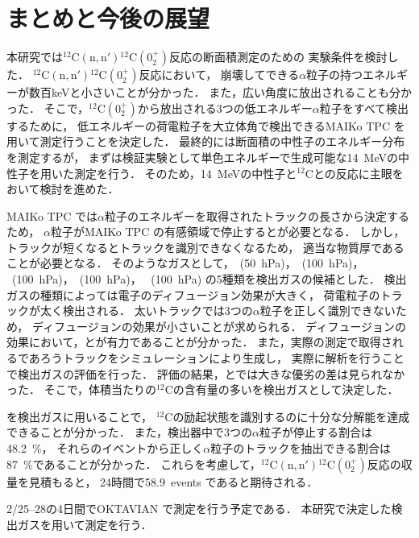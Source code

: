 \documentclass[../master]{subfiles}
\begin{document}
\chapter{まとめと今後の展望}
本研究では${}^{12}\mathrm{C}(\mathrm{n}, \mathrm{n}'){}^{12}\mathrm{C} (0_2^+)$反応の断面積測定のための
実験条件を検討した．
${}^{12}\mathrm{C}(\mathrm{n}, \mathrm{n}'){}^{12}\mathrm{C} (0_2^+)$反応において，
崩壊してできる$\alpha$粒子の持つエネルギーが数百\si{\kilo\electronvolt}と小さいことが分かった．
また，広い角度に放出されることも分かった．
そこで，${}^{12}\mathrm{C} (0_2^+)$から放出される3つの低エネルギー$\alpha$粒子をすべて検出するために，
低エネルギーの荷電粒子を大立体角で検出できるMAIKo TPC を用いて測定行うことを決定した．
最終的には断面積の中性子のエネルギー分布を測定するが，
まずは検証実験として単色エネルギーで生成可能な\SI{14}{\mega\electronvolt}の中性子を用いた測定を行う．
そのため，\SI{14}{\mega\electronvolt}の中性子と${}^{12}\mathrm{C}$との反応に主眼をおいて検討を進めた．

MAIKo TPC では$\alpha$粒子のエネルギーを取得されたトラックの長さから決定するため，
$\alpha$粒子がMAIKo TPC の有感領域で停止するとが必要となる．
しかし，トラックが短くなるとトラックを識別できなくなるため，
適当な物質厚であることが必要となる．
そのようなガスとして，\Methane~(\SI{50}{\hecto\pascal})，\MethaneHydro~(\SI{100}{\hecto\pascal})，
\MethaneHerium~(\SI{100}{\hecto\pascal})，\isoButaneHydro~(\SI{100}{\hecto\pascal})，
\isoButaneHerium~(\SI{100}{\hecto\pascal}) の5種類を検出ガスの候補とした．
検出ガスの種類によっては電子のディフュージョン効果が大きく，
荷電粒子のトラックが太く検出される．
太いトラックでは3つの$\alpha$粒子を正しく識別できないため，
ディフュージョンの効果が小さいことが求められる．
ディフュージョンの効果において，\MethaneHydro と\isoButaneHydro が有力であることが分かった．
また，実際の測定で取得されるであろうトラックをシミュレーションにより生成し，
実際に解析を行うことで検出ガスの評価を行った．
評価の結果，\MethaneHydro と\isoButaneHydro では大きな優劣の差は見られなかった．
そこで，体積当たりの${}^{12}\mathrm{C}$の含有量の多い\isoButaneHydro を検出ガスとして決定した．

\isoButaneHydro を検出ガスに用いることで，
${}^{12}\mathrm{C}$の励起状態を識別するのに十分な分解能を達成できることが分かった．
また，検出器中で3つの$\alpha$粒子が停止する割合は\SI{48.2}{\percent}，
それらのイベントから正しく$\alpha$粒子のトラックを抽出できる割合は\SI{87}{\percent}であることが分かった．
これらを考慮して，${}^{12}\mathrm{C}(\mathrm{n}, \mathrm{n}'){}^{12}\mathrm{C} (0_2^+)$反応の収量を見積もると，
24時間で58.9~events であると期待される．

2/25--28の4日間でOKTAVIAN で測定を行う予定である．
本研究で決定した検出ガスを用いて測定を行う．
\end{document}
